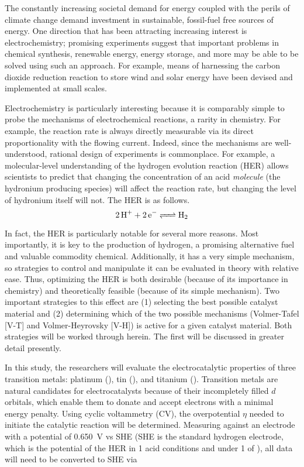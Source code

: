 \documentclass[../labs.tex]{subfiles}
\begin{document}


The constantly increasing societal demand for energy coupled with the perils of climate change demand investment in sustainable, fossil-fuel free sources of energy. One direction that has been attracting increasing interest is electrochemistry; promising experiments suggest that important problems in chemical synthesis, renewable energy, energy storage, and more may be able to be solved using such an approach.\supercite{bib:ElectrocatalysisApplications} For example, means of harnessing the carbon dioxide reduction reaction to store wind and solar energy have been devised and implemented at small scales.\supercite{bib:WuttigLecture}\par
Electrochemistry is particularly interesting because it is comparably simple to probe the mechanisms of electrochemical reactions, a rarity in chemistry.\supercite{bib:WuttigLecture} For example, the reaction rate is always directly measurable via its direct proportionality with the flowing current. Indeed, since the mechanisms are well-understood, rational design of experiments is commonplace. For example, a molecular-level understanding of the hydrogen evolution reaction (HER) allows scientists to predict that changing the concentration of an acid \emph{molecule} (the hydronium producing species) will affect the reaction rate, but changing the level of hydronium itself will not. The HER is as follows.
\begin{equation}
    \ce{2H+ + 2e^- <=> H2}
\end{equation}\par
In fact, the HER is particularly notable for several more reasons. Most importantly, it is key to the production of hydrogen, a promising alternative fuel and valuable commodity chemical. Additionally, it has a very simple mechanism, so strategies to control and manipulate it can be evaluated in theory with relative ease. Thus, optimizing the HER is both desirable (because of its importance in chemistry) and theoretically feasible (because of its simple mechanism). Two important strategies to this effect are (1) selecting the best possible catalyst material and (2) determining which of the two possible mechanisms (Volmer-Tafel [V-T] and Volmer-Heyrovsky [V-H])\supercite{bib:EChemIdea} is active for a given catalyst material. Both strategies will be worked through herein. The first will be discussed in greater detail presently.\par
In this study, the researchers will evaluate the electrocatalytic properties of three transition metals: platinum (), tin (), and titanium (). Transition metals are natural candidates for electrocatalysts because of their incompletely filled $d$ orbitals, which enable them to donate and accept electrons with a minimal energy penalty. Using cyclic voltammetry (CV), the overpotential $\eta$ needed to initiate the catalytic reaction will be determined. Measuring against an  electrode with a potential of \SI{0.650}{\volt} vs SHE (SHE is the standard hydrogen electrode, which is the potential of the HER in \SI{1}{\molar} acid conditions and under \SI{1}{\atmosphere} of ), all data will need to be converted to SHE via
\end{document}
